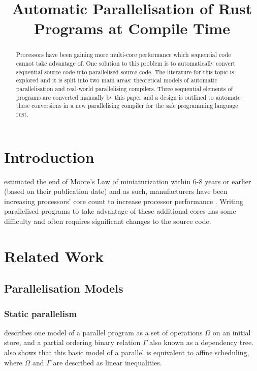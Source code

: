 \documentclass[conference]{IEEEtran}
\begin{document}
\title{Automatic Parallelisation of Rust Programs at Compile Time}

\author{
\and
{}
}

\maketitle

\begin{abstract}
  Processors have been gaining more multi-core performance which sequential code cannot take advantage of. One solution to this problem is to automatically convert sequential source code into parallelised source code. The literature for this topic is explored and it is split into two main areas: theoretical models of automatic parallelisation and real-world parallelising compilers. Three sequential elements of programs are converted manually by this paper and a design is outlined to automate these conversions in a new parallelising compiler for the safe programming language rust.
\end{abstract}

\section{Introduction}
\textcite{Kish2002} estimated the end of Moore's Law of miniaturization within 6-8 years or earlier (based on their publication date) and as such, manufacturers have been increasing processors' core count to increase processor performance \parencite{Geer2005}. Writing parallelised programs to take advantage of these additional cores has some difficulty and often requires significant changes to the source code.

\section{Related Work}
\subsection{Parallelisation Models}
\subsubsection{Static parallelism}
\textcite{Feautrier1992} describes one model of a parallel program as a set of operations $\Omega$ on an initial store, and a partial ordering binary relation $\Gamma$ also known as a dependency tree. \textcite{Feautrier1992} also shows that this basic model of a parallel is equivalent to affine scheduling, where $\Omega$ and $\Gamma$ are described as linear inequalities.
\end{document}
